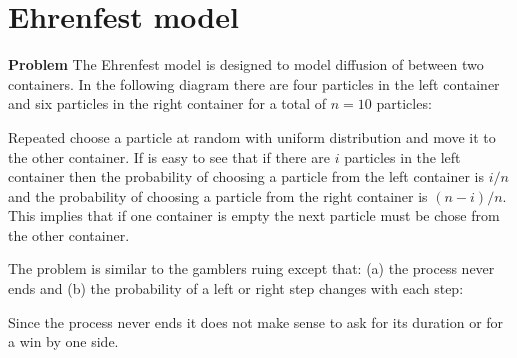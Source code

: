 
\section{Ehrenfest model}\label{s.ehrenfest}

\textbf{Problem} The Ehrenfest model is designed to model diffusion of between two containers. In the following diagram there are four particles in the left container and six particles in the right container for a total of $n=10$ particles:
\begin{center}
\end{center}
Repeated choose a particle at random with uniform distribution and move it to the other container. If is easy to see that if there are $i$ particles in the left container then the probability of choosing a particle from the left container is $i/n$ and the probability of choosing a particle from the right container is $(n-i)/n$. This implies that if one container is empty the next particle must be chose from the other container. 

The problem is similar to the gamblers ruing except that: (a) the process never ends and (b) the probability of a left or right step changes with each step:
\begin{center}
\end{center}
Since the process never ends it does not make sense to ask for its duration or for a win by one side.

